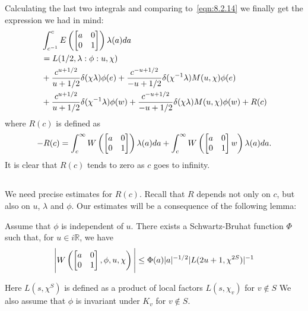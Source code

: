 Calculating the last two integrals and comparing to~\eqref{eqn:8.2.14} we finally get the expression we had in mind:
\begin{equation}
    \label{eqn:8.2.18}
    \begin{aligned}
        &\int_{c^{-1}}^{c} E\left(\begin{bmatrix} a & 0 \\ 0 & 1 \end{bmatrix}\right) \lambda(a)da \\
        &=L(1/2, \lambda :\phi: u, \chi) \\
        &+ \frac{c^{u+1/2}}{u + 1/2} \delta(\chi\lambda) \phi(e) + \frac{c^{-u+1/2}}{-u+1/2} \delta(\chi^{-1}\lambda) M(u, \chi)\phi(e) \\
        &+ \frac{c^{u+1/2}}{u  +1/2} \delta(\chi^{-1}\lambda) \phi(w) +\frac{c^{-u+1/2}}{-u+1/2} \delta(\chi\lambda) M(u, \chi)\phi(w) + R(c)
    \end{aligned}
\end{equation}
where $R(c)$ is defined as
\begin{align}
    \label{eqn:8.2.19}
    -R(c) = \int_{c}^{\infty} W\left(\begin{bmatrix} a & 0 \\ 0 & 1 \end{bmatrix}\right) \lambda(a) da + \int_{c}^{\infty} W\left(\begin{bmatrix} a & 0 \\ 0 & 1 \end{bmatrix}w\right) \lambda(a) da.
\end{align}
It is clear that $R(c)$ tends to zero as $c$ goes to infinity.

\subsection{}
We need precise estimates for $R(c)$.
Recall that $R$ depends not only on $c$, but also on $u$, $\lambda$ and $\phi$.
Our estimates will be a consequence of the following lemma:

\begin{lemma}
Assume that $\phi$ is independent of $u$.
There exists a Schwartz-Bruhat function $\Phi$ such that, for $u \in i\mathbb{R}$, we have
\begin{align*}
    \Bigg|W\left(\begin{bmatrix} a & 0 \\ 0 & 1 \end{bmatrix}, \phi, u, \chi\right)\Bigg| \leq \Phi(a) |a|^{-1/2} |L(2u+1, \chi^{2S})|^{-1}
\end{align*}
\end{lemma}
Here $L(s, \chi^{S})$ is defined as a product of local factors $L(s, \chi_v)$ for $v \not\in S$
We also assume that $\phi$ is invariant under $K_v$ for $v\not\in S$.


